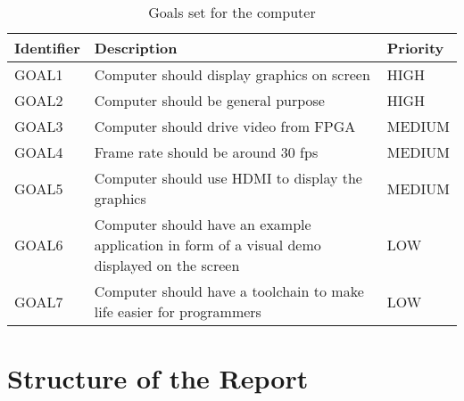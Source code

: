 \documentclass[../main/report.tex]{subfiles}
\begin{document}
\begin{table}[h]
    \centering
    \begin{tabular}{|l|p{8cm}|l|}
        \hline
        \textbf{Identifier}           & \textbf{Description}                & \textbf{Priority} \\ \hline
        GOAL1  & Computer should display graphics on screen                           & HIGH    \\ \hline
        GOAL2  & Computer should be general purpose                                   & HIGH    \\ \hline
        GOAL3  & Computer should drive video from FPGA                                & MEDIUM  \\ \hline
        GOAL4  & Frame rate should be around 30 fps                                   & MEDIUM  \\ \hline
        GOAL5  & Computer should use HDMI to display the graphics                     & MEDIUM  \\ \hline
        GOAL6  & Computer should have an example application in form of a visual demo displayed on the screen       & LOW     \\ \hline
        GOAL7  & Computer should have a toolchain to make life easier for programmers & LOW     \\ \hline
    \end{tabular}
    \caption{Goals set for the computer}
    \label{tab:goals}
\end{table}

\section{Structure of the Report}

\end{document}
